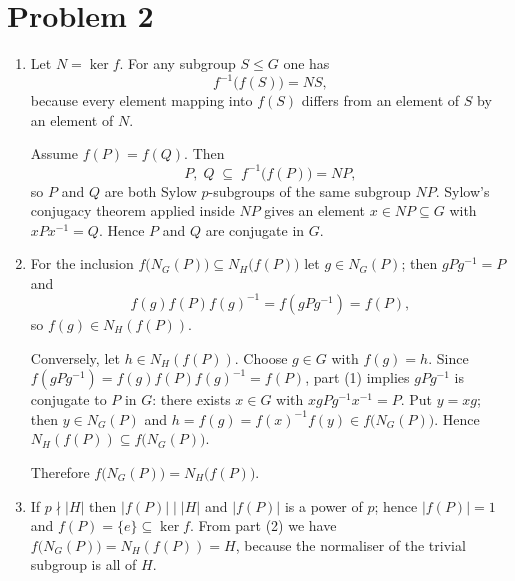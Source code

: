 \documentclass[12pt]{article}
\begin{document}
\section*{Problem 2}
\begin{enumerate}[label=(\arabic*)]

\item
Let \(N=\ker f\).  For any subgroup \(S\le G\) one has
\[
f^{-1}\!\bigl(f(S)\bigr)=NS,
\]
because every element mapping into \(f(S)\) differs from an element of \(S\) by an element of \(N\).

Assume \(f(P)=f(Q)\).  Then
\[
P,\;Q\;\subseteq\;f^{-1}\!\bigl(f(P)\bigr)=NP ,
\]
so \(P\) and \(Q\) are both Sylow \(p\)-subgroups of the same subgroup \(NP\).
Sylow's conjugacy theorem applied inside \(NP\) gives an element
\(x\in NP\subseteq G\) with \(xPx^{-1}=Q\).
Hence \(P\) and \(Q\) are conjugate in \(G\).

\item
For the inclusion \(f\!\bigl(N_G(P)\bigr)\subseteq
N_H\!\bigl(f(P)\bigr)\) let \(g\in N_G(P)\); then \(gPg^{-1}=P\) and
\[
f(g)f(P)f(g)^{-1}=f(gPg^{-1})=f(P),
\]
so \(f(g)\in N_H(f(P))\).

Conversely, let \(h\in N_H(f(P))\).  Choose \(g\in G\) with \(f(g)=h\).
Since
\(f(gPg^{-1})=f(g)f(P)f(g)^{-1}=f(P)\),
part (1) implies \(gPg^{-1}\) is conjugate to \(P\) in \(G\):
there exists \(x\in G\) with \(xgPg^{-1}x^{-1}=P\).
Put \(y=xg\); then \(y\in N_G(P)\) and
\(h=f(g)=f(x)^{-1}f(y)\in f\!\bigl(N_G(P)\bigr)\).
Hence \(N_H(f(P))\subseteq f\!\bigl(N_G(P)\bigr)\).

Therefore \(f\!\bigl(N_G(P)\bigr)=N_H\!\bigl(f(P)\bigr)\).

\item
If \(p\nmid |H|\) then \(|f(P)|\mid|H|\) and \(|f(P)|\) is a power of \(p\); hence \(|f(P)|=1\) and \(f(P)=\{e\}\subseteq\ker f\).
From part (2) we have \(f\!\bigl(N_G(P)\bigr)=N_H(f(P))=H\),
because the normaliser of the trivial subgroup is all of \(H\).
\end{enumerate}
\end{document}
